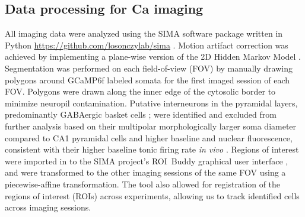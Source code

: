 \subsection{Data processing for Ca imaging}\label{sec:methods:processing}
All imaging data were analyzed using the SIMA software package written in Python \url{https://github.com/losonczylab/sima} \citep{Kaifosh2014}. Motion artifact correction was achieved by implementing a plane-wise version of the 2D Hidden Markov Model \citep{Dombeck2010}\citep{Kaifosh2013}\citep{Kaifosh2014}. Segmentation was performed on each field-of-view (FOV) by manually drawing polygons around GCaMP6f labeled somata for the first imaged session of each FOV.  Polygons were drawn along the inner edge of the cytosolic border to minimize neuropil contamination. Putative interneurons in the pyramidal layers, predominantly GABAergic basket cells \citep{Bezaire2013}\citep{Freund1996}\citep{Klausberger2008}; were identified and excluded from further analysis based on their multipolar morphologically larger soma diameter compared to CA1 pyramidal cells \citep{Ambros-Ingerson2005}\citep{Gulyas1999a}\citep{Papp2013} and higher baseline and nuclear fluorescence, consistent with their higher baseline tonic firing rate \emph{in vivo} \citep{Klausberger2003}\citep{Klausberger2003}\citep{Lapray2012}\citep{Varga2012}. Regions of interest were imported in to the SIMA project’s ROI~Buddy graphical user interface \citep{Kaifosh2014}, and were transformed to the other imaging sessions of the same FOV using a piecewise-affine transformation. The tool also allowed for registration of the regions of interest (ROIs) across experiments, allowing us to track identified cells across imaging sessions.

